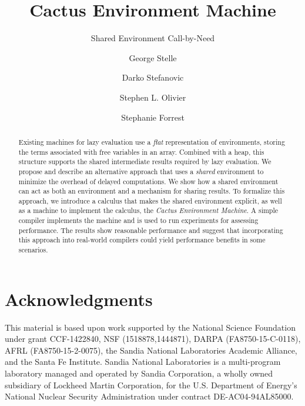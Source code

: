\documentclass{llncs}
\begin{document}
\title{Cactus Environment Machine}
\subtitle{Shared Environment Call-by-Need}

\author{George Stelle \and Darko Stefanovic 
        \and Stephen L. Olivier 
        \and Stephanie Forrest
        }
      

\maketitle
\setcounter{footnote}{0}

\begin{abstract}
Existing machines for lazy evaluation use a \emph{flat} representation of
environments, storing the terms associated with free variables in an array.
Combined with a heap, this structure supports the shared intermediate results
required by lazy evaluation.  We propose and describe an alternative
approach that uses a \emph{shared} environment to minimize the overhead of
delayed computations. We show how a shared environment can act as both an
environment and a mechanism for sharing results. To formalize this approach, we
introduce a calculus that makes the shared environment explicit, as well as
a machine to implement the calculus, the \emph{Cactus Environment Machine}. A
simple compiler implements the machine and is used to run experiments for
assessing performance. The results show reasonable performance and suggest that
incorporating this approach into real-world compilers could yield performance
benefits in some scenarios.
\end{abstract}












\section{Acknowledgments}
This material is based upon work supported by the National Science Foundation
under grant CCF-1422840, NSF (1518878,1444871), DARPA (FA8750-15-C-0118), AFRL
(FA8750-15-2-0075), the Sandia National Laboratories Academic Alliance, and the
Santa Fe Institute. Sandia National Laboratories is a multi-program laboratory
managed and operated by Sandia Corporation, a wholly owned subsidiary of
Lockheed Martin Corporation, for the U.S. Department of Energy’s National
Nuclear Security Administration under contract DE-AC04-94AL85000.



% 
\end{document}
